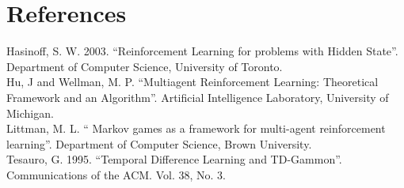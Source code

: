 \documentclass[letterpaper]{article}
\begin{document}
\section{References}
Hasinoff, S. W. 2003. ``Reinforcement Learning for problems with Hidden State''. Department of Computer Science, University of Toronto.\\

Hu, J and Wellman, M. P. ``Multiagent Reinforcement Learning: Theoretical Framework and an Algorithm''. Artificial Intelligence Laboratory, University of Michigan.\\

Littman, M. L. `` Markov games as a framework for multi-agent reinforcement learning''. Department of Computer Science, Brown University.\\

Tesauro, G. 1995. ``Temporal Difference Learning and TD-Gammon''. Communications of the ACM. Vol. 38, No. 3.
\end{document}

